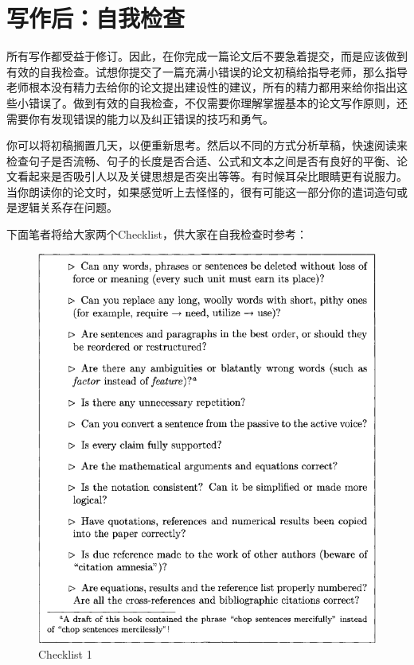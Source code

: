 \documentclass{formatBook}
\begin{document}
\section{写作后：自我检查}
所有写作都受益于修订。因此，在你完成一篇论文后不要急着提交，而是应该做到有效的自我检查。试想你提交了一篇充满小错误的论文初稿给指导老师，那么指导老师根本没有精力去给你的论文提出建设性的建议，所有的精力都用来给你指出这些小错误了。做到有效的自我检查，不仅需要你理解掌握基本的论文写作原则，还需要你有发现错误的能力以及纠正错误的技巧和勇气。\par
你可以将初稿搁置几天，以便重新思考。然后以不同的方式分析草稿，快速阅读来检查句子是否流畅、句子的长度是否合适、公式和文本之间是否有良好的平衡、论文看起来是否吸引人以及关键思想是否突出等等。有时候耳朵比眼睛更有说服力。当你朗读你的论文时，如果感觉听上去怪怪的，很有可能这一部分你的遣词造句或是逻辑关系存在问题。\par
下面笔者将给大家两个Checklist\cite{tan_checklist_nodate}，供大家在自我检查时参考：
\begin{figure}[htb]
    \centering
    \includegraphics{figure/Figure 7.1.png}
    \caption{Checklist 1}
    \label{fig:my_label}
\end{figure}
\end{document}
